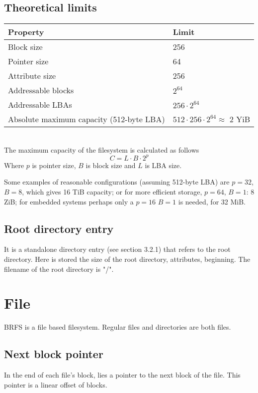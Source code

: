 \documentclass[]{article}
\begin{document}
	\subsection{Theoretical limits}

	\begin{tabular}{|l|l|}
		\hline
		\textbf{Property} & \textbf{Limit} \\ [0.5ex]
		\hline
		Block size & 256 \\
		\hline
		Pointer size & 64 \\
		\hline
		Attribute size & 256 \\
		\hline
		Addressable blocks & $2^{64}$ \\
		\hline
		Addressable LBAs & $256 \cdot 2^{64}$ \\
		\hline
		Absolute maximum capacity (512-byte LBA) & $512 \cdot 256 \cdot 2^{64} \approx $ 2 YiB \\
		\hline
	\end{tabular}\\

	The maximum capacity of the filesystem is calculated as follows
	\begin{equation}
		C = L \cdot B \cdot 2^p
	\end{equation}
	Where $p$ is pointer size, $B$ is block size and $L$ is LBA size.

	Some examples of reasonable configurations (assuming 512-byte LBA) are $p = 32$, $B = 8$, which gives 16 TiB capacity; or for more efficient storage, $p = 64$, $B = 1$: 8 ZiB; for embedded systems perhaps only a $p = 16$ $B = 1$ is needed, for 32 MiB.

	\subsection{Root directory entry}

	It is a standalone directory entry (see section 3.2.1) that refers to the root directory. Here is stored the size of the root directory, attributes, beginning. The filename of the root directory is "/".

	\section{File}

	BRFS is a file based filesystem. Regular files and directories are both files.

	\subsection{Next block pointer}
	In the end of each file's block, lies a pointer to the next block of the file. This pointer is a linear offset of blocks. \\
\end{document}
